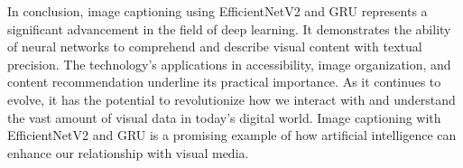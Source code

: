 \documentclass[oneside,a4paper,12pt]{report}
\begin{document}
In conclusion, image captioning using EfficientNetV2 and GRU represents a significant advancement in the field of deep learning. It demonstrates the ability of neural networks to comprehend and describe visual content with textual precision. The technology's applications in accessibility, image organization, and content recommendation underline its practical importance. As it continues to evolve, it has the potential to revolutionize how we interact with and understand the vast amount of visual data in today's digital world. Image captioning with EfficientNetV2 and GRU is a promising example of how artificial intelligence can enhance our relationship with visual media.


\end{document}
